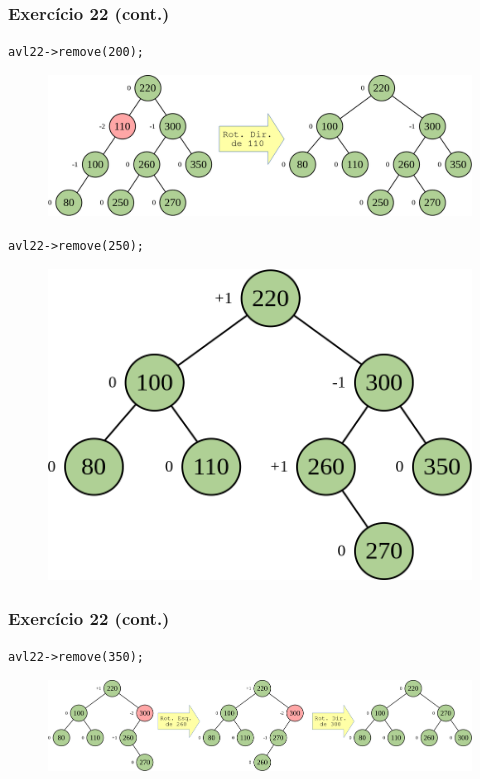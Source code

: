 \documentclass[aspectratio=169]{beamer}
\begin{document}
\begin{frame}[fragile]\frametitle{Exercício 22 (cont.)}
\texttt{avl22->remove(200);}
\begin{figure}[h]
	\centering
	\includegraphics[height=0.25\paperheight]{imagens/avl-exercicio22g.png}
\end{figure}
\texttt{avl22->remove(250);}
\begin{figure}[h]
	\centering
	\includegraphics[height=0.25\paperheight]{imagens/avl-exercicio22h.png}
\end{figure}
\end{frame}

\begin{frame}[fragile]\frametitle{Exercício 22 (cont.)}
\texttt{avl22->remove(350);}
\begin{figure}[h]
	\centering
	\includegraphics[height=0.35\paperheight]{imagens/avl-exercicio22i.png}
\end{figure}
\end{frame}

\end{document}
